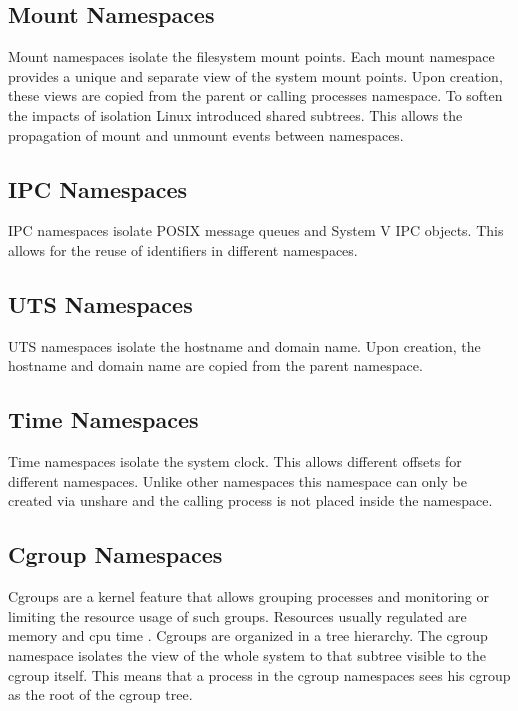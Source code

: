 \documentclass[10pt,twocolumn,a4paper]{article}
\begin{document}
\subsection{Mount Namespaces}
Mount namespaces isolate the filesystem mount points. 
Each mount namespace provides a unique and separate view of the system mount points. 
Upon creation, these views are copied from the parent or calling processes namespace.
To soften the impacts of isolation Linux introduced shared subtrees. This allows the propagation of
mount and unmount events between namespaces.\cite{12}

\subsection{IPC Namespaces}
IPC namespaces isolate POSIX message queues and System V IPC objects. This allows for the reuse of identifiers
in different namespaces.\cite{13}

\subsection{UTS Namespaces}
UTS namespaces isolate the hostname and domain name. Upon creation, the hostname and domain name are copied from the parent namespace.\cite{14}

\subsection{Time Namespaces}
Time namespaces isolate the system clock. This allows different offsets for different namespaces.
Unlike other namespaces this namespace can only be created via unshare and the calling process is
not placed inside the namespace.\cite{15}

\subsection{Cgroup Namespaces}
Cgroups are a kernel feature that allows grouping processes and monitoring or limiting the resource usage
of such groups. Resources usually regulated are memory and cpu time \cite{16}. Cgroups are
organized in a tree hierarchy. The cgroup namespace isolates the view of the whole system to
that subtree visible to the cgroup itself. This means that a process
in the cgroup namespaces sees his cgroup as the root of the cgroup tree. \cite{17}
\end{document}
